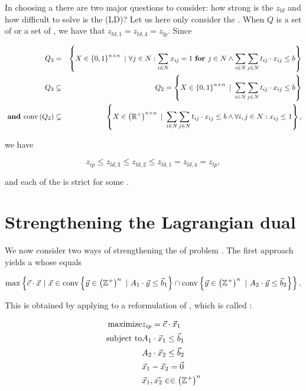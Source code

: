 In choosing a  there are two major questions to consider: how strong is the  $z_{ld}$ and how difficult to solve is the  (LD)? Let us here only consider the . When $Q$ is a set of  or a set of , we have that $z_{ld,1}=z_{ld,4}=z_{lp}$. Since

\begin{eqnarray}
Q_3&=&\condset{X\in\accl{0,1}^{n\times n}}{\forall j\in N:\sumdomain[i]{N}{x_{ij}}=1\xfor j\in N\wedge\sumdomain[i]{N}{\sumdomain[j]{N}{t_{ij}\cdot x_{ij}}}\leq b}\\
Q_3&\subsetneq&Q_2=\condset{X\in\accl{0,1}^{n\times n}}{\sumdomain[i]{N}{\sumdomain[j]{N}{t_{ij}\cdot x_{ij}}}\leq b}\\
\xand\funm{conv}{Q_2}&\subsetneq&\condset{X\in\brak{\RRR^+}^{n\times n}}{\sumdomain[i]{N}{\sumdomain[j]{N}{t_{ij}\cdot x_{ij}}}\leq b\wedge\forall i,j\in N:x_{ij}\leq 1},
\end{eqnarray}

we have

\begin{equation}
z_{ip}\leq z_{ld,3}\leq z_{ld,2}\leq z_{ld,1}=z_{ld,4}=z_{lp},
\end{equation}

and each of the  is strict for some .

\section{Strengthening the Lagrangian dual}

We now consider two ways of strengthening the  of problem . The first approach yields a  whose  equals

\begin{equation}
\funcs{\max}{\vec{c}\cdot\vec{x}}{\vec{x}\in\funmcs{conv}{\vec{y}\in\brak{\ZZZ^+}^n}{A_1\cdot\vec{y}\leq\vec{b}_1}\cap\funmcs{conv}{\vec{y}\in\brak{\ZZZ^+}^n}{A_2\cdot\vec{y}\leq\vec{b}_2}}.
\end{equation}

This  is obtained by applying  to a reformulation of , which is called :

\begin{eqnarray}
\mbox{maximize}&z_{ip}=\vec{c}\cdot\vec{x}_1\eqnlab{rip-m}\\
\mbox{subject to}&A_1\cdot\vec{x}_1\leq\vec{b}_1\eqnlab{rip-c1}\\
&A_2\cdot\vec{x}_2\leq\vec{b}_2\eqnlab{rip-c2}\\
&\vec{x}_1-\vec{x}_2=\vec{0}\eqnlab{rip-c3}\\
&\vec{x}_1,\vec{x_2}\in\in\brak{\ZZZ^+}^n\eqnlab{rip-c4}
\end{eqnarray}

